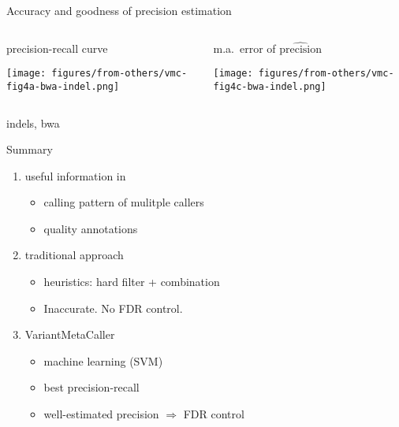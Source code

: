 \documentclass{beamer} %
\begin{document}
\begin{frame}{Accuracy and goodness of precision estimation}
\begin{columns}[t]
\begin{column}{0.7\textwidth}
precision-recall curve
\bigskip

\texttt{[image: figures/from-others/vmc-fig4a-bwa-indel.png]}
\end{column}

\begin{column}{0.3\textwidth}
m.a.~error of \(\widehat{\text{precision}}\)
\bigskip

\texttt{[image: figures/from-others/vmc-fig4c-bwa-indel.png]}
\end{column}
\end{columns}
\bigskip

\hline
\small indels, bwa
\end{frame}

\begin{frame}{Summary}
\begin{enumerate}
\item useful information in
\begin{itemize}
\item calling pattern of mulitple callers
\item quality annotations 
\end{itemize}
\item traditional approach
\begin{itemize}
\item heuristics: hard filter + combination
\item Inaccurate. No FDR control. 
\end{itemize} 
\item VariantMetaCaller
\begin{itemize}
\item machine learning (SVM)
\item best precision-recall
\item well-estimated precision \(\Rightarrow\) FDR control
\end{itemize}
\end{enumerate}

\end{frame}
\end{document}
